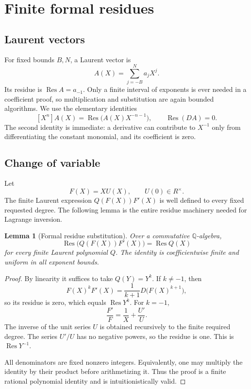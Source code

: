 \documentclass[11pt]{article}
\newtheorem{lemma}[theorem]{Lemma}
\theoremstyle{definition}
\newcommand{\Q}{\mathbb Q}
\newcommand{\Res}{\operatorname{Res}}
\begin{document}
\section{Finite formal residues}\label{sec:residue}

\subsection{Laurent vectors}

For fixed bounds \(B,N\), a Laurent vector is
\[
 A(X)=\sum_{j=-B}^{N}a_jX^j.
\]
Its residue is \(\Res A=a_{-1}\).  Only a finite interval of exponents is ever
needed in a coefficient proof, so multiplication and substitution are again
bounded algorithms.  We use the elementary identities
\[
 [X^n]A(X)=\Res\bigl(A(X)X^{-n-1}\bigr),
 \qquad \Res(DA)=0.
\]
The second identity is immediate: a derivative can contribute to \(X^{-1}\)
only from differentiating the constant monomial, and its coefficient is zero.

\subsection{Change of variable}

Let
\[
 F(X)=XU(X),\qquad U(0)\in R^\times.
\]
The finite Laurent expression \(Q(F(X))F'(X)\) is well defined to every fixed
requested degree.  The following lemma is the entire residue machinery needed
for Lagrange inversion.

\begin{lemma}[Formal residue substitution]\label{lem:res-subst}
Over a commutative \(\Q\)-algebra,
\[
 \Res\bigl(Q(F(X))F'(X)\bigr)=\Res Q(X)
\]
for every finite Laurent polynomial \(Q\).  The identity is coefficientwise
finite and uniform in all exponent bounds.
\end{lemma}
\begin{proof}
By linearity it suffices to take \(Q(Y)=Y^k\).
If \(k\ne-1\), then
\[
 F(X)^kF'(X)=\frac{1}{k+1}D\bigl(F(X)^{k+1}\bigr),
\]
so its residue is zero, which equals \(\Res Y^k\).
For \(k=-1\),
\[
 \frac{F'}{F}=\frac1X+\frac{U'}{U}.
\]
The inverse of the unit series \(U\) is obtained recursively to the finite
required degree.  The series \(U'/U\) has no negative powers, so the residue is
one.  This is \(\Res Y^{-1}\).

All denominators are fixed nonzero integers.  Equivalently, one may multiply
the identity by their product before arithmetizing it.  Thus the proof is a
finite rational polynomial identity and is intuitionistically valid.
\end{proof}
\end{document}
